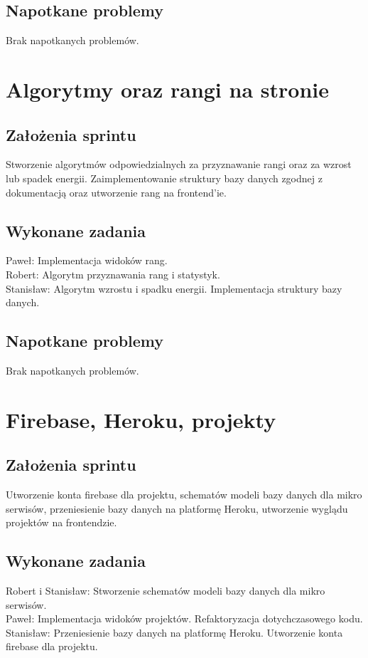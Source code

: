 \documentclass[a4paper,11pt]{report}
\begin{document}
\subsection {Napotkane problemy}
Brak napotkanych problemów.

\section {Algorytmy oraz rangi na stronie}
\subsection {Założenia sprintu}
Stworzenie algorytmów odpowiedzialnych za przyznawanie rangi oraz za wzrost lub spadek energii. Zaimplementowanie struktury bazy danych zgodnej z dokumentacją oraz utworzenie rang na frontend'ie.
\subsection {Wykonane zadania}
Paweł: Implementacja widoków rang. \\
Robert: Algorytm przyznawania rang i statystyk.\\
Stanisław: Algorytm wzrostu i spadku energii. Implementacja struktury bazy danych.\\
\subsection {Napotkane problemy}
Brak napotkanych problemów.

\section {Firebase, Heroku, projekty}
\subsection {Założenia sprintu}
Utworzenie konta firebase dla projektu, schematów modeli bazy danych dla mikro serwisów, przeniesienie bazy danych na platformę Heroku, utworzenie wyglądu projektów na frontendzie.
\subsection {Wykonane zadania}
Robert i Stanisław: Stworzenie schematów modeli bazy danych dla mikro serwisów.\\
Paweł: Implementacja widoków projektów. Refaktoryzacja dotychczasowego kodu. \\
Stanisław: Przeniesienie bazy danych na platformę Heroku. Utworzenie konta firebase dla projektu.\\
\end{document}
